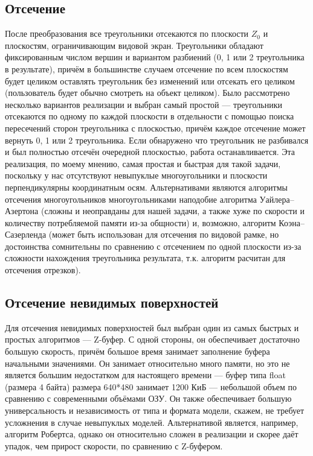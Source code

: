\documentclass[a4paper,12pt]{report}
\begin{document}
\subsection{Отсечение}
После преобразования все треугольники отсекаются по плоскости $Z_0$ и плоскостям, ограничивающим видовой экран. Треугольники обладают фиксированным числом вершин и вариантом разбиений (0, 1 или 2 треугольника в результате), причём в большинстве случаем отсечение по всем плоскостям будет целиком оставлять треугольник без изменений или отсекать его целиком (пользователь будет обычно смотреть на объект целиком). Было рассмотрено несколько вариантов реализации и выбран самый простой --- треугольники отсекаются по одному по каждой плоскости в отдельности с помощью поиска пересечений сторон треугольника с плоскостью, причём каждое отсечение может вернуть 0, 1 или 2 треугольника. Если обнаружено что треугольник не разбивался и был полностью отсечён очередной плоскостью, работа останавливается. Эта реализация, по моему мнению, самая простая и быстрая для такой задачи, поскольку у нас отсутствуют невыпуклые многоугольники и плоскости перпендикулярны координатным осям. Альтернативами являются алгоритмы отсечения многоугольников многоугольниками наподобие алгоритма Уайлера--Азертона (сложны и неоправданы для нашей задачи, а также хуже по скорости и количеству потребляемой памяти из-за общности) и, возможно, алгоритм Коэна--Сазерленда (может быть использован для отсечения по видовой рамке, но достоинства сомнительны по сравнению с отсечением по одной плоскости из-за сложности нахождения треугольника результата, т.к. алгоритм расчитан для отсечения отрезков).

\subsection{Отсечение невидимых поверхностей}
Для отсечения невидимых поверхностей был выбран один из самых быстрых и простых алгоритмов --- Z-буфер. С одной стороны, он обеспечивает достаточно большую скорость, причём большое время занимает заполнение буфера начальными значениями. Он занимает относительно много памяти, но это не является большим недостатком для настоящего времени --- буфер типа float (размера 4 байта) размера 640*480 занимает 1200 КиБ --- небольшой объем по сравнению с современными объёмами ОЗУ. Он также обеспечивает большую универсальность и независимость от типа и формата модели, скажем, не требует усложнения в случае невыпуклых моделей. Альтернативой является, например, алгоритм Робертса, однако он относительно сложен в реализации и скорее даёт упадок, чем прирост скорости, по сравнению с Z-буфером.
\end{document}
